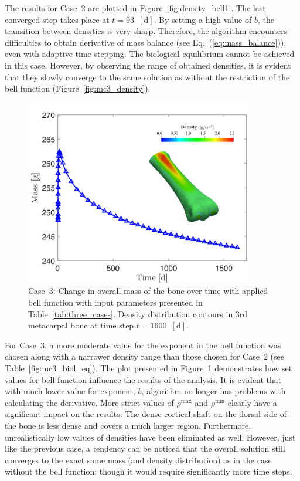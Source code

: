 \documentclass[11pt]{acmeArticle}
\numberwithin{equation}{section}
\begin{document}
The results for Case~2 are plotted in Figure~\ref{fig:density_bell1}.
The last converged step takes place at $t=93$~$[{\text{d}}]$. 
By setting a high value of $b$, the transition between densities is very sharp. 
Therefore, the algorithm encounters difficulties to obtain derivative of mass balance (see Eq.~(\ref{eq:mass_balance})), even with adaptive time-stepping. 
The biological equilibrium cannot be achieved in this case. 
However, by observing the range of obtained densities, it is evident that they slowly converge to the same solution as without the restriction of the bell function (Figure~\ref{fig:mc3_density}). 
\begin{figure}[h!]
	\begin{centering}
		\includegraphics[width=10cm]{Figures/graphs/density_bell2.png}
		\caption{Case~3: Change in overall mass of the bone over time with applied bell function with input parameters presented in Table~\ref{tab:three_cases}. Density distribution contours in 3rd metacarpal bone at time step $t=1600$~$[{\text{d}}]$.}
		\label{fig:density_bell2}
	\end{centering}
\end{figure}

For Case~3, a more moderate value for the exponent in the bell function was chosen along with a narrower density range than those chosen for Case~2 (see Table~\ref{fig:mc3_biol_eq}).
The plot presented in Figure~\ref{fig:density_bell2} demonstrates how set values for bell function influence the results of the analysis. 
It is evident that with much lower value for exponent, $b$, algorithm no longer has problems with calculating the derivative. 
More strict values of $\rho^\mathrm{max}$ and $\rho^\mathrm{min}$ clearly have a significant impact on the results. 
The dense cortical shaft on the dorsal side of the bone is less dense and covers a much larger region. 
Furthermore, unrealistically low values of densities have been eliminated as well. 
However, just like the previous case, a tendency can be noticed that the overall solution still converges to the exact same mass (and density distribution) as in the case without the bell function; though it would require significantly more time steps. \\
\end{document}
